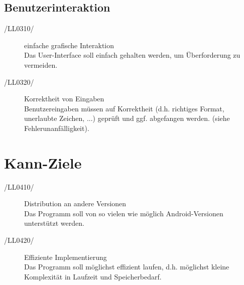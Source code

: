 \documentclass[11pt,a4paper]{scrreprt}
\begin{document}
\subsection{Benutzerinteraktion}
\begin{description}
\item[/LL0310/] einfache grafische Interaktion \ \\
Das User-Interface soll einfach gehalten werden, um Überforderung zu vermeiden. 

\item[/LL0320/] Korrektheit von Eingaben \ \\
Benutzereingaben müssen auf Korrektheit (d.h. richtiges Format, unerlaubte Zeichen, ...) geprüft und ggf. abgefangen werden.
(siehe Fehlerunanfälligkeit).
\end{description}

\section{Kann-Ziele}
\begin{description}
\item[/LL0410/] Distribution an andere Versionen \ \\
Das Programm soll von so vielen wie möglich Android-Versionen unterstützt werden.

\item[/LL0420/] Effiziente Implementierung \ \\
Das Programm soll möglichst effizient laufen, d.h. möglichst kleine Komplexität in Laufzeit und Speicherbedarf.
\end{description}
\end{document}
